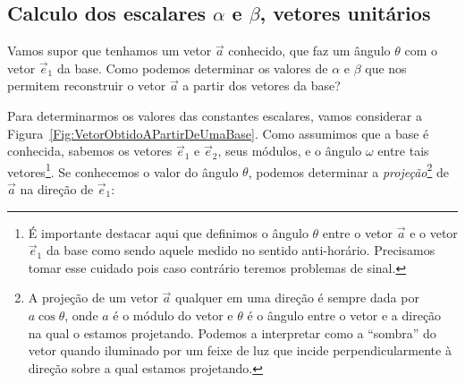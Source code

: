 \subsection{Calculo dos escalares $\alpha$ e $\beta$, vetores unitários}

Vamos supor que tenhamos um vetor $\vec{a}$ conhecido, que faz um ângulo $\theta$ com o vetor $\vec{e}_1$ da base. Como podemos determinar os valores de $\alpha$ e $\beta$ que nos permitem reconstruir o vetor $\vec{a}$ a partir dos vetores da base?

Para determinarmos os valores das constantes escalares, vamos considerar a Figura~\ref{Fig:VetorObtidoAPartirDeUmaBase}. Como assumimos que a base é conhecida, sabemos os vetores $\vec{e}_1$ e $\vec{e}_2$, seus módulos, e o ângulo $\omega$ entre tais vetores\footnote[][-4.5cm]{É importante destacar aqui que definimos o ângulo $\theta$ entre o vetor $\vec{a}$ e o vetor $\vec{e}_1$ da base como sendo aquele medido no sentido anti-horário. Precisamos tomar esse cuidado pois caso contrário teremos problemas de sinal.}. Se conhecemos o valor do ângulo $\theta$, podemos determinar a \emph{projeção}\footnote[][-2.5cm]{A projeção de um vetor $\vec{a}$ qualquer em uma direção é sempre dada por $a\cos\theta$, onde $a$ é o módulo do vetor e $\theta$ é o ângulo entre o vetor e a direção na qual o estamos projetando. Podemos a interpretar como a ``sombra'' do vetor quando iluminado por um feixe de luz que incide perpendicularmente à direção sobre a qual estamos projetando.} de $\vec{a}$ na direção de $\vec{e}_1$:
